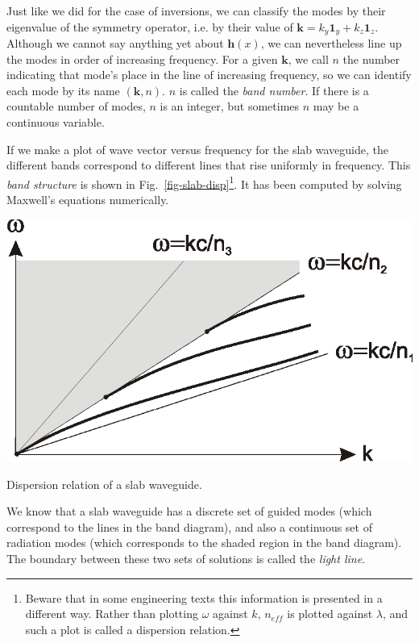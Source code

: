Just like we did for the case of inversions, we can classify the modes by their eigenvalue of the symmetry operator, i.e. by their value of ${\mathbf k} = k_y {\mathbf 1}_y + k_z {\mathbf 1}_z$. Although we cannot say anything yet about ${\mathbf h}(x)$, we can nevertheless line up the modes in order of increasing frequency. For a given ${\mathbf k}$, we call $n$ the number indicating that mode's place in the line of increasing frequency, so we can identify each mode by its name $({\mathbf k},n)$.
$n$ is called the \emph{band number}. If there is a countable number of modes, $n$ is an integer, but sometimes $n$ may be a continuous variable. 

If we make a plot of wave vector versus frequency for the slab waveguide, the different bands correspond to different lines that rise uniformly in frequency. This \emph{band structure} is shown in Fig.~\ref{fig-slab-disp}\footnote{Beware that in some engineering texts this information is presented in a different way. Rather than plotting $\omega$ against $k$, $n_{eff}$ is plotted against $\lambda$, and such a plot is called a dispersion relation.}. It has been computed by solving Maxwell's equations numerically.

\begin{marginfigure}
\centering
\includegraphics{symmetry/figures/slabdisp}
\caption{Dispersion relation of a slab waveguide.}
\label{fig-slab-disp}
\end{marginfigure}

We know that a slab waveguide has a discrete set of guided modes (which correspond to the lines in the band diagram), and also a continuous set of radiation modes (which corresponds to the shaded region in the band diagram). The boundary between these two sets of solutions is called the \emph{light line}.

